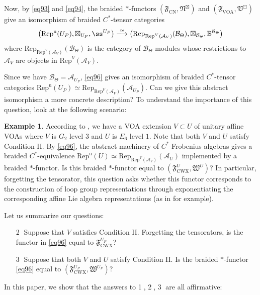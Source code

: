 \documentclass[11pt,b5paper,notitlepage]{article}
\theoremstyle{definition}
\newtheorem{eg}[df]{Example}
\theoremstyle{plain}
\newcommand{\fk}{\mathfrak}
\newcommand{\mc}{\mathcal}
\newcommand{\Rep}{\mathrm{Rep}}
\newcommand{\uni}{\mathrm{u}}
\newcommand{\RepU}{\mathrm{Rep}^\uni(U)}
\newcommand{\CWX}{{\scriptscriptstyle \mathrm{CWX}}}
\newcommand{\VOA}{{\scriptscriptstyle \mathrm{VOA}}}
\newcommand{\CN}{{\scriptscriptstyle \mathrm{CN}}}
\newcommand{\RepUP}{\mathrm{Rep}^{\mathrm u}(U_P)}
\numberwithin{equation}{section}
\begin{document}
Now, by \eqref{eq93} and \eqref{eq94}, the braided $*$-functors $(\fk F_\CN,\fk N^\boxtimes)$ and $(\fk F_\VOA,\fk V^\boxdot)$ give an isomorphism of braided $C^*$-tensor categories
\begin{align}\label{eq96}
\big(\RepUP,\boxtimes_{U_P},\ss^{U_P} \big)\xlongrightarrow{\simeq}\big(\Rep_{\Rep^V(\mc A_V)}(\mc B_\Theta),\boxtimes_{\mc B_\Theta},\mathbb B^{\mc B_\Theta}\big)
\end{align}
where $\Rep_{\Rep^V(\mc A_V)}(\mc B_\Theta)$ is the category of $\mc B_\Theta$-modules whose restrictions to $\mc A_V$ are objects in $\Rep^V(\mc A_V)$. 

Since we have $\mc B_\Theta=\mc A_{U_P}$, \eqref{eq96} gives an isomorphism of braided $C^*$-tensor categories $\RepUP\simeq\Rep_{\Rep^V(\mc A_V)}(\mc A_{U_P})$. Can we give this abstract isomorphism a more concrete description? To understand the importance of this question, look at the following scenario:


\begin{eg}
According to \cite[Appendix]{DMNO13}, we have a VOA extension $V\subset U$ of unitary affine VOAs where $V$ is $G_2$ level $3$ and $U$ is $E_6$ level $1$. Note that both $V$ and $U$ satisfy Condition II. By \eqref{eq96}, the abstract machinery of $C^*$-Frobenius algebras gives a braided $C^*$-equivalence $\RepU\simeq\Rep_{\Rep^V(\mc A_V)}(\mc A_U)$ implemented by a braided $*$-functor. Is this braided $*$-functor equal to $(\fk F^U_\CWX,\fk W^U)$? In particular, forgetting the tensorator, this question asks whether this functor corresponds to the construction of loop group representations through exponentiating the corresponding affine Lie algebra representations (as in  \cite{GF93,Was98,TL99} for example).
\end{eg}


Let us summarize our questions:
\begin{itemize}
\item[\large\textcircled{\small 2}] Suppose that $V$ satisfies Condition II. Forgetting the tensorators, is the functor in \eqref{eq96} equal to $\fk F^{U_P}_\CWX$?
\item[\large\textcircled{\small 3}] Suppose that both $V$ and $U$ satisfy Condition II. Is the braided $*$-functor \eqref{eq96} equal to $(\fk F^{U_P}_\CWX,\fk W^{U_P})$?
\end{itemize}

In this paper, we show that the answers to \large\textcircled{\small 1}, \large\textcircled{\small 2}, \large\textcircled{\small 3} \normalsize are all affirmative: 
\end{document}
